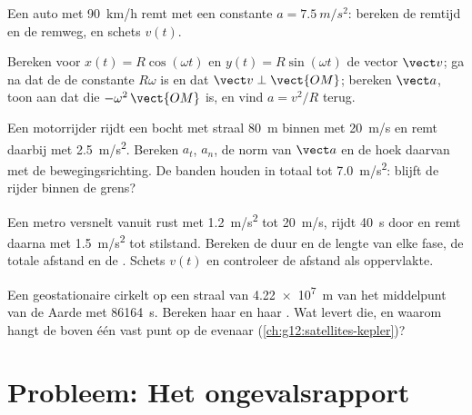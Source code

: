 \begin{exercise}[$\star\star$]\label{exo:g12:kinematics-2d:11}
Een auto met \qty{90}{km/h} remt met een constante $a = \qty{7.5}{m/s^2}$:
bereken de remtijd en de remweg, en schets $v(t)$.
\end{exercise}

\begin{exercise}[$\star\star\star$]\label{exo:g12:kinematics-2d:12}
Bereken voor $x(t) = R\cos(\omega t)$ en $y(t) = R\sin(\omega t)$ de
vector $\vect v$; ga na dat de  de constante $R\omega$ is en dat
$\vect v \perp \vect{OM}$; bereken $\vect a$, toon aan dat die
$-\omega^2\,\vect{OM}$ is, en vind $a = v^2/R$ terug.
\end{exercise}

\begin{exercise}[$\star\star\star$]\label{exo:g12:kinematics-2d:13}
Een motorrijder rijdt een bocht met straal \qty{80}{m} binnen met
\qty{20}{m/s} en remt daarbij met \qty{2.5}{m/s^2}. Bereken $a_t$, $a_n$,
de norm van $\vect a$ en de hoek daarvan met de bewegingsrichting. De
banden houden in totaal tot \qty{7.0}{m/s^2}: blijft de rijder binnen de
grens?
\end{exercise}

\begin{exercise}[$\star\star\star$]\label{exo:g12:kinematics-2d:14}
Een metro versnelt vanuit rust met \qty{1.2}{m/s^2} tot \qty{20}{m/s},
rijdt \qty{40}{s} door en remt daarna met \qty{1.5}{m/s^2} tot stilstand.
Bereken de duur en de lengte van elke fase, de totale afstand en de
. Schets $v(t)$ en controleer de afstand als
oppervlakte.
\end{exercise}

\begin{exercise}[$\star\star\star$]\label{exo:g12:kinematics-2d:15}
Een geostationaire  cirkelt op een straal van \qty{4.22e7}{m} van
het middelpunt van de Aarde met  \qty{86164}{s}. Bereken haar
 en haar . Wat levert die, en waarom
hangt de  boven één vast punt op de evenaar
(\cref{ch:g12:satellites-kepler})?
\end{exercise}

\section{Probleem: Het ongevalsrapport}

